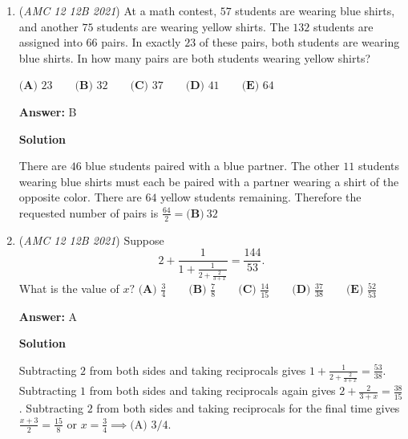 \begin{enumerate}
\textbf{Solution 5}

There are an odd number of integer solutions $x$ to this inequality since if any non-zero integer $x$ satisfies this inequality, then so does $-x,$ and we must also account for $0,$ which gives us the desired. Then, the answer is either $\textbf{(A)}$ or $\textbf{(D)},$ and since $3 \pi > 3 \cdot 3 > 9,$ the answer is at least $9 \cdot 2 + 1 = 19,$ yielding $\boxed{\textbf{(D)} ~19}.$



	\item (\textit{AMC 12 12B 2021}) At a math contest, $57$ students are wearing blue shirts, and another $75$ students are wearing yellow shirts. The $132$ students are assigned into $66$ pairs. In exactly $23$ of these pairs, both students are wearing blue shirts. In how many pairs are both students wearing yellow shirts?


 $\textbf{(A) }23 \qquad \textbf{(B) }32 \qquad \textbf{(C) }37 \qquad \textbf{(D) }41 \qquad \textbf{(E) }64$

 \textbf{Answer: }B



\textbf{Solution}

There are $46$ blue students paired with a blue partner. The other $11$ students wearing blue shirts must each be paired with a partner wearing a shirt of the opposite color. There are $64$ yellow students remaining. Therefore the requested number of pairs is $\frac{64}{2}=\boxed{\textbf{(B)} ~32}$



	\item (\textit{AMC 12 12B 2021}) Suppose
 \[2+\frac{1}{1+\frac{1}{2+\frac{2}{3+x}}}=\frac{144}{53}.\]What is the value of $x?$
$\textbf{(A) }\frac34 \qquad \textbf{(B) }\frac78 \qquad \textbf{(C) }\frac{14}{15} \qquad \textbf{(D) }\frac{37}{38} \qquad \textbf{(E) }\frac{52}{53}$

 \textbf{Answer: }A



\textbf{Solution}

Subtracting $2$ from both sides and taking reciprocals gives $1+\frac{1}{2+\frac{2}{3+x}}=\frac{53}{38}$. Subtracting $1$ from both sides and taking reciprocals again gives $2+\frac{2}{3+x}=\frac{38}{15}$. Subtracting $2$ from both sides and taking reciprocals for the final time gives $\frac{x+3}{2}=\frac{15}{8}$ or $x=\frac{3}{4} \implies \boxed{\text{(A) } 3/4}$.

 



\end{enumerate}
